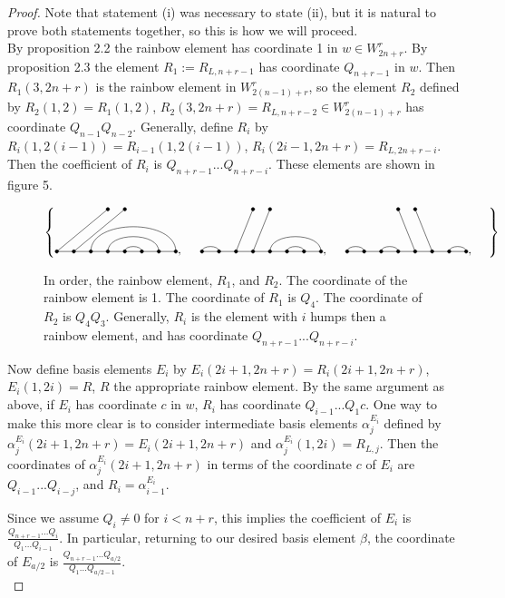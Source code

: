 \documentclass{amsart}
\begin{document}
\vspace{10mm}
\begin{proof}
	Note that statement (i) was necessary to state (ii), but it is natural to prove both statements together, so this is how we will proceed.
	\\
	
	By proposition 2.2 the rainbow element has coordinate 1 in $w\in W_{2n+r}^r$. By proposition 2.3 the element $R_1:=R_{L,n+r-1}$ has coordinate $Q_{n+r-1}$ in $w$. Then $R_1(3,2n+r)$ is the rainbow element in  $W_{2(n-1)+r}^r$, so the element $R_2$ defined by $R_2(1,2)=R_1(1,2)$, $R_2(3,2n+r)=R_{L,n+r-2}\in W_{2(n-1)+r}^r$ has coordinate $Q_{n-1}Q_{n-2}$. Generally, define $R_i$ by $R_i(1,2(i-1))=R_{i-1}(1,2(i-1))$, $R_i(2i-1,2n+r)=R_{L,2n+r-i}$. Then the coefficient of $R_i$ is $Q_{n+r-1}...Q_{n+r-i}$. These elements are shown in figure 5.
	
	\begin{figure}
		\def\cbasisspacing{5mm}
		
		$\cbr{
			\begin{gathered}
			\GeneralizedMatching{8}{3/8, 4/7,5/6}{2}{1/1,2/2}{5/4}, \hspace{\cbasisspacing}
			\GeneralizedMatching{8}{1/2, 5/8,6/7}{2}{3/1,4/2}{5/4}, 
			\hspace{\cbasisspacing}
			\GeneralizedMatching{8}{1/2, 3/4,7/8}{2}{5/1,6/2}{5/4}, \hspace{\cbasisspacing}
			\end{gathered}}$ 
		\caption{In order, the rainbow element, $R_1$, and $R_2$. The coordinate of the rainbow element is 1. The coordinate of $R_1$ is $Q_{4}$. The coordinate of $R_2$ is $Q_4Q_3$. Generally, $R_i$ is the element with $i$ humps then a rainbow element, and has coordinate $Q_{n+r-1}...Q_{n+r-i}$.}
	\end{figure}
	
	Now define basis elements $E_i$ by $E_i(2i+1,2n+r)=R_i(2i+1,2n+r)$, $E_i(1,2i)=R$, $R$ the appropriate rainbow element. By the same argument as above, if $E_i$ has coordinate $c$ in $w$, $R_i$ has coordinate $Q_{i-1}...Q_{1}c$. One way to make this more clear is to consider intermediate basis elements $\alpha_j^{E_i}$ defined by $\alpha_j^{E_i}(2i+1,2n+r)=E_i(2i+1,2n+r)$ and $\alpha_j^{E_i}(1,2i)=R_{L,j}$. Then the coordinates of $\alpha_j^{E_i}(2i+1,2n+r)$ in terms of the coordinate $c$ of $E_i$ are $Q_{i-1}...Q_{i-j}$, and $R_i=\alpha_{i-1}^{E_i}$. 
	
	Since we assume $Q_i\not=0$ for $i< n+r$, this implies the coefficient of $E_i$ is $\frac{Q_{n+r-1}...Q_i}{Q_1...Q_{i-1}}$. In particular, returning to our desired basis element $\beta$, the coordinate of $E_{a/2}$ is $\frac{Q_{n+r-1}...Q_{a/2}}{Q_1...Q_{a/2-1}}$.
	\\
	

\end{proof}
\end{document}
